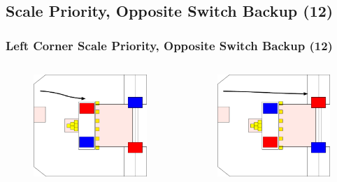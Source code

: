 \documentclass{beamer}
\begin{document}
\subsection{Scale Priority, Opposite Switch Backup (12)}

\begin{frame}
 \frametitle{Left Corner Scale Priority, Opposite Switch Backup \alert{(12)}}
 \begin{columns}
  \begin{figure}
   \includegraphics[scale=0.15]{assets/paths/12_LR}
  \end{figure}
  \begin{figure}
   \includegraphics[scale=0.15]{assets/paths/12_RL}

\end{figure}
\end{columns}
\end{frame}
\end{document}
